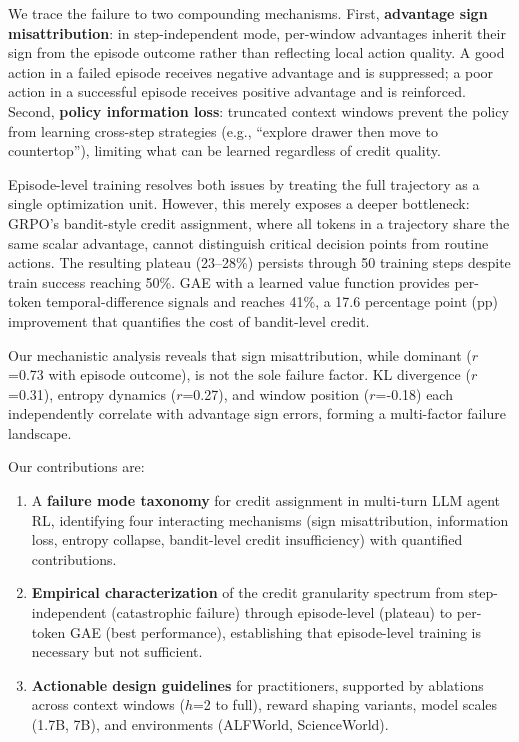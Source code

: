 \documentclass{article}
\begin{document}
We trace the failure to two compounding mechanisms. First, \textbf{advantage sign misattribution}: in step-independent mode, per-window advantages inherit their sign from the episode outcome rather than reflecting local action quality. A good action in a failed episode receives negative advantage and is suppressed; a poor action in a successful episode receives positive advantage and is reinforced. Second, \textbf{policy information loss}: truncated context windows prevent the policy from learning cross-step strategies (e.g., ``explore drawer then move to countertop''), limiting what can be learned regardless of credit quality.

Episode-level training resolves both issues by treating the full trajectory as a single optimization unit. However, this merely exposes a deeper bottleneck: GRPO's bandit-style credit assignment, where all tokens in a trajectory share the same scalar advantage, cannot distinguish critical decision points from routine actions. The resulting plateau (23--28\%) persists through 50 training steps despite train success reaching 50\%. GAE with a learned value function provides per-token temporal-difference signals and reaches 41\%, a 17.6 percentage point (pp) improvement that quantifies the cost of bandit-level credit.

Our mechanistic analysis reveals that sign misattribution, while dominant ($r$=0.73 with episode outcome), is not the sole failure factor. KL divergence ($r$=0.31), entropy dynamics ($r$=0.27), and window position ($r$=-0.18) each independently correlate with advantage sign errors, forming a multi-factor failure landscape.

Our contributions are:
\begin{enumerate}
    \item A \textbf{failure mode taxonomy} for credit assignment in multi-turn LLM agent RL, identifying four interacting mechanisms (sign misattribution, information loss, entropy collapse, bandit-level credit insufficiency) with quantified contributions.
    \item \textbf{Empirical characterization} of the credit granularity spectrum from step-independent (catastrophic failure) through episode-level (plateau) to per-token GAE (best performance), establishing that episode-level training is necessary but not sufficient.
    \item \textbf{Actionable design guidelines} for practitioners, supported by ablations across context windows ($h$=2 to full), reward shaping variants, model scales (1.7B, 7B), and environments (ALFWorld, ScienceWorld).
\end{enumerate}
\end{document}
